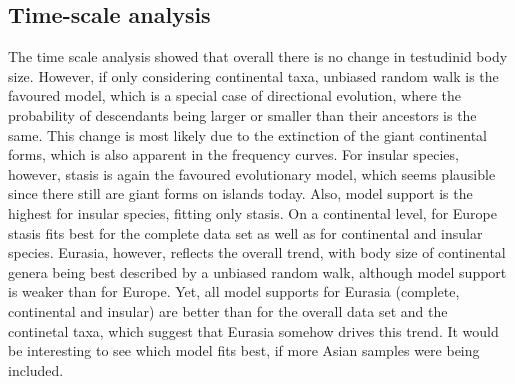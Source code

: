 





\subsection{Time-scale analysis}

The time scale analysis showed that overall there is no change in testudinid body size. However, if only considering continental taxa, unbiased random walk is the favoured model, which is a special case of directional evolution, where the probability of descendants being larger or smaller than their ancestors is the same.
This change is most likely due to the extinction of the giant continental forms, which is also apparent in the frequency curves. 
For insular species, however, stasis is again the favoured evolutionary model, which seems plausible since there still are giant forms on islands today. Also, model support is the highest for insular species, fitting only stasis.
On a continental level, for Europe stasis fits best for the complete data set as well as for continental and insular species.
Eurasia, however, reflects the overall trend, with body size of continental genera being best described by a unbiased random walk, although model support is weaker than for Europe.
Yet, all model supports for Eurasia (complete, continental and insular) are better than for the overall data set and the continetal taxa, which suggest that Eurasia somehow drives this trend.
It would be interesting to see which model fits best, if more Asian samples were being included.

